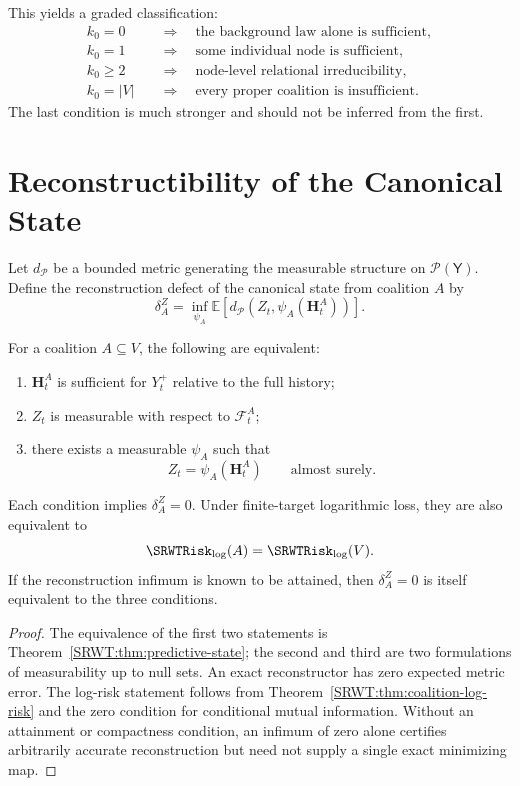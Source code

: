 This yields a graded classification:
\[
\begin{aligned}
k_0=0
&\quad\Longrightarrow\quad
\text{the background law alone is sufficient},\\
k_0=1
&\quad\Longrightarrow\quad
\text{some individual node is sufficient},\\
k_0\geq2
&\quad\Longrightarrow\quad
\text{node-level relational irreducibility},\\
k_0=|V|
&\quad\Longrightarrow\quad
\text{every proper coalition is insufficient}.
\end{aligned}
\]
The last condition is much stronger and should not be inferred from the first.

\section{Reconstructibility of the Canonical State}

Let \(d_{\mathcal P}\) be a bounded metric generating the measurable structure
on \(\mathcal P(\mathsf Y)\). Define the reconstruction defect of the canonical
state from coalition \(A\) by
\[
\delta_A^Z
=
\inf_{\psi_A}
\mathbb E\!\left[
 d_{\mathcal P}\!\left(
 Z_t,\psi_A(\mathbf H_t^A)
 \right)
\right].
\]

\begin{SRWTproposition}
\label{SRWT:prop:sufficiency-reconstruction}
For a coalition \(A\subseteq V\), the following are equivalent:
\begin{enumerate}
\item \(\mathbf H_t^A\) is sufficient for \(Y_t^+\) relative to the full
 history;
\item \(Z_t\) is measurable with respect to \(\mathcal F_t^A\);
\item there exists a measurable \(\psi_A\) such that
\[
Z_t=\psi_A(\mathbf H_t^A)
\qquad\text{almost surely}.
\]
\end{enumerate}
Each condition implies \(\delta_A^Z=0\). Under finite-target logarithmic loss,
they are also equivalent to
\[
\SRWTRisk_{\log}(A)=\SRWTRisk_{\log}(V).
\]
If the reconstruction infimum is known to be attained, then
\(\delta_A^Z=0\) is itself equivalent to the three conditions.
\end{SRWTproposition}

\begin{proof}
The equivalence of the first two statements is
Theorem~\ref{SRWT:thm:predictive-state}; the second and third are two formulations
of measurability up to null sets. An exact reconstructor has zero expected
metric error. The log-risk statement follows from
Theorem~\ref{SRWT:thm:coalition-log-risk} and the zero condition for conditional
mutual information. Without an attainment or compactness condition, an
infimum of zero alone certifies arbitrarily accurate reconstruction but need
not supply a single exact minimizing map.
\end{proof}

